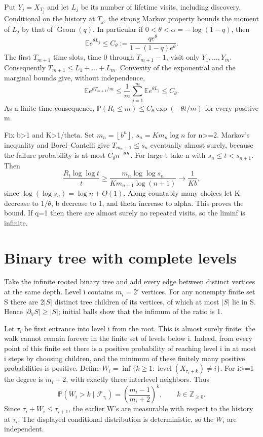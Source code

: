 \documentclass[11pt]{article}
\begin{document}
Put \(Y_j=X_{T_j}\) and let \(L_j\) be its number of lifetime visits, including discovery. Conditional on the history at \(T_j\), the strong Markov property bounds the moment of \(L_j\) by that of \(\operatorname{Geom}(q)\). In particular if \(0<\theta <\alpha =-\log (1-q)\), then
\[
\mathbb E e^{\theta L_j}\le C_\theta:=\frac{q e^\theta}{1-(1-q)e^\theta}.
\]
The first \(T_{m+1}\) time slots, time 0 through \(T_{m+1}-1\), visit only \(Y_1,\ldots ,Y_m\). Consequently \(T_{m+1} \le  L_1+\ldots +L_m\). Convexity of the exponential and the marginal bounds give, without independence,
\[
\mathbb E e^{\theta T_{m+1}/m}
\le \frac{1}{m}\sum_{j=1}^m\mathbb E e^{\theta L_j}\le C_\theta.
\]
As a finite-time consequence, \(\mathbb{P}(R_t\le m) \le  C_\theta  \exp (-\theta  t/m)\) for every positive m.

Fix b\textgreater1 and K\textgreater1/theta. Set \(m_n=\left\lfloor b^n\right\rfloor\), \(s_n=K m_n \log  n\) for n\textgreater=2. Markov's inequality and Borel--Cantelli give \(T_{m_n+1}\le s_n\) eventually almost surely, because the failure probability is at most \(C_\theta  n^{-\theta  K}\). For large t take n with \(s_n\le t<s_{n+1}\). Then
\[
\frac{R_t\log\log t}{t}\ge
\frac{m_n\log\log s_n}{K m_{n+1}\log(n+1)}
\longrightarrow\frac{1}{K b},
\]
since \(\log (\log  s_n)=\log  n+O(1)\). Along countably many choices let K decrease to \(1/\theta\), b decrease to 1, and theta increase to alpha. This proves the bound. If q=1 then there are almost surely no repeated visits, so the liminf is infinite.

\section{Binary tree with complete levels}\label{binary-tree-with-complete-levels}

Take the infinite rooted binary tree and add every edge between distinct vertices at the same depth. Level i contains \(m_i=2^i\) vertices. For any nonempty finite set S there are \(2|S|\) distinct tree children of its vertices, of which at most \(|S|\) lie in S. Hence \(|\partial _V S|\ge |S|\); initial balls show that the infimum of the ratio is 1.

Let \(\tau _i\) be first entrance into level i from the root. This is almost surely finite: the walk cannot remain forever in the finite set of levels below i. Indeed, from every point of this finite set there is a positive probability of reaching level i in at most i steps by choosing children, and the minimum of these finitely many positive probabilities is positive. Define \(W_i=\inf\{k\ge1:\operatorname{level}(X_{\tau_i+k})\ne i\}\). For i\textgreater=1 the degree is \(m_i+2\), with exactly three interlevel neighbors. Thus
\[
\mathbb P(W_i>k\mid\mathcal F_{\tau_i})=
\left(\frac{m_i-1}{m_i+2}\right)^k,\qquad k\in\mathbb Z_{\ge0}.
\]
Since \(\tau _i+W_i\le \tau _{i+1}\), the earlier W's are measurable with respect to the history at \(\tau _i\). The displayed conditional distribution is deterministic, so the \(W_i\) are independent.
\end{document}
